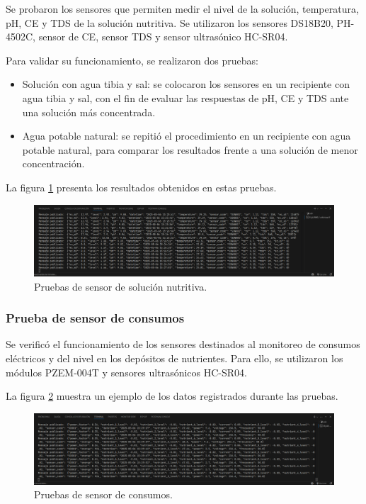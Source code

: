 Se probaron los sensores que permiten medir el nivel de la solución,
temperatura, pH, CE y TDS de la solución nutritiva. Se utilizaron los sensores
DS18B20, PH-4502C, sensor de CE, sensor TDS y sensor ultrasónico HC-SR04.

Para validar su funcionamiento, se realizaron dos pruebas:

\begin{itemize}
    \item Solución con agua tibia y sal: se colocaron los sensores en un recipiente con
          agua tibia y sal, con el fin de evaluar las respuestas de pH, CE y TDS ante una
          solución más concentrada.
    \item Agua potable natural: se repitió el procedimiento en un recipiente con agua
          potable natural, para comparar los resultados frente a una solución de menor
          concentración.
\end{itemize}

La figura \ref{fig:medicion_sensor_solucion} presenta los resultados obtenidos
en estas pruebas.

\begin{figure}[H]
    \centering
    \includegraphics[width=\textwidth]{Images/52_sensor_solucion_nutritiva.png}
    \caption[Pruebas de sensor de solución nutritiva]{Pruebas de sensor de solución nutritiva.}
    \label{fig:medicion_sensor_solucion}
\end{figure}

\subsubsection{Prueba de sensor de consumos}

Se verificó el funcionamiento de los sensores destinados al monitoreo de
consumos eléctricos y del nivel en los depósitos de nutrientes. Para ello, se
utilizaron los módulos PZEM-004T y sensores ultrasónicos HC-SR04.

La figura \ref{fig:medicion_sensor_consumo} muestra un ejemplo de los datos
registrados durante las pruebas.

\begin{figure}[H]
    \centering
    \includegraphics[width=\textwidth]{Images/53_sensor_consumos.png}
    \caption[Pruebas de sensor de consumos]{Pruebas de sensor de consumos.}
    \label{fig:medicion_sensor_consumo}
\end{figure}

